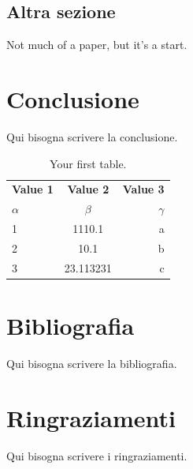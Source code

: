 \documentclass[10pt, twoside, openany]{book}
\begin{document}
\section{Altra sezione}
Not much of a paper, but it's a start.

\chapter{Conclusione}
Qui bisogna scrivere la conclusione.\\
\begin{table}[h!]
  \begin{center}
    \caption{Your first table.}
    \label{tab:table1}
    \begin{tabular}{l|c|r} %
      \textbf{Value 1} & \textbf{Value 2} & \textbf{Value 3}\\
      $\alpha$ & $\beta$ & $\gamma$ \\
      \hline
      1 & 1110.1 & a\\
      2 & 10.1 & b\\
      3 & 23.113231 & c\\
    \end{tabular}
  \end{center}
\end{table}

\chapter*{Bibliografia}
Qui bisogna scrivere la bibliografia.

\chapter*{Ringraziamenti}
Qui bisogna scrivere i ringraziamenti.
\end{document}
